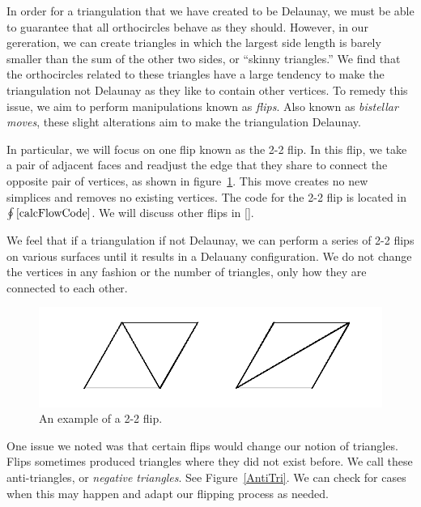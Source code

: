 \documentclass[12pt]{article}
\begin{document}
\noindent In order for a triangulation that we have created to be Delaunay, we must be able to guarantee that all orthocircles behave as they should. However, in our gereration, we can create triangles in which the largest side length is barely smaller than the sum of the other two sides, or ``skinny triangles.'' We find that the orthocircles related to these triangles have a large tendency to make the triangulation not Delaunay as they like to contain other vertices. To remedy this issue, we aim to perform manipulations known as \textit{flips}. Also known as \textit{bistellar moves}, these slight alterations aim to make the triangulation Delaunay. \newline

\noindent In particular, we will focus on one flip known as the 2-2 flip. In this flip, we take a pair of adjacent faces and readjust the edge that they share to connect the opposite pair of vertices, as shown in figure~\ref{fig:flip}. This move creates no new simplices and removes no existing vertices. The code for the 2-2 flip is located in $\oint\ref{calcFlowCode}$. We will discuss other flips in []. \newline

\noindent We feel that if a triangulation if not Delaunay, we can perform a series of 2-2 flips on various surfaces until it results in a Delauany configuration. We do not change the vertices in any fashion or the number of triangles, only how they are connected to each other. \newline

\begin{figure}
\centering
\includegraphics[scale = 0.8]{Pictures/Flip.png}
\caption{An example of a 2-2 flip.}
\label{fig:flip}
\end{figure}

\noindent One issue we noted was that certain flips would change our notion of triangles. Flips sometimes produced triangles where they did not exist before. We call these anti-triangles, or \textit{negative triangles}. See Figure~\ref{AntiTri}. We can check for cases when this may happen and adapt our flipping process as needed. \newline
\end{document}
